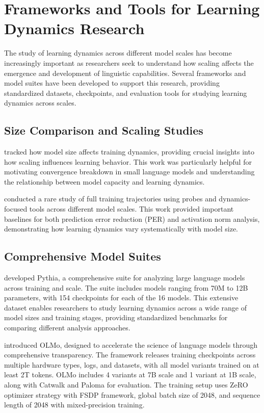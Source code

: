 \section{Frameworks and Tools for Learning Dynamics Research}

The study of learning dynamics across different model scales has become increasingly important as researchers seek to understand how scaling affects the emergence and development of linguistic capabilities. Several frameworks and model suites have been developed to support this research, providing standardized datasets, checkpoints, and evaluation tools for studying learning dynamics across scales.

\subsection{Size Comparison and Scaling Studies}

\citet{bansal2021scaling} tracked how model size affects training dynamics, providing crucial insights into how scaling influences learning behavior. This work was particularly helpful for motivating convergence breakdown in small language models and understanding the relationship between model capacity and learning dynamics.

\citet{xia2023training_trajectories} conducted a rare study of full training trajectories using probes and dynamics-focused tools across different model scales. This work provided important baselines for both prediction error reduction (PER) and activation norm analysis, demonstrating how learning dynamics vary systematically with model size.

\subsection{Comprehensive Model Suites}

\citet{biderman2023pythia} developed Pythia, a comprehensive suite for analyzing large language models across training and scale. The suite includes models ranging from 70M to 12B parameters, with 154 checkpoints for each of the 16 models. This extensive dataset enables researchers to study learning dynamics across a wide range of model sizes and training stages, providing standardized benchmarks for comparing different analysis approaches.

\citet{groeneveld2024olmo} introduced OLMo, designed to accelerate the science of language models through comprehensive transparency. The framework releases training checkpoints across multiple hardware types, logs, and datasets, with all model variants trained on at least 2T tokens. OLMo includes 4 variants at 7B scale and 1 variant at 1B scale, along with Catwalk and Paloma for evaluation. The training setup uses ZeRO optimizer strategy with FSDP framework, global batch size of 2048, and sequence length of 2048 with mixed-precision training.

